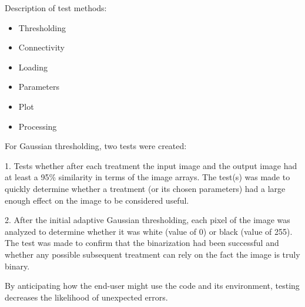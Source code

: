 \begin{enumerate}
Description of test methods:
        \begin{itemize}
            \item Thresholding
            \item Connectivity
            \item Loading
            \item Parameters
            \item Plot
            \item Processing
        \end{itemize}



For Gaussian thresholding, two tests were created:

1. Tests whether after each treatment the input image and the output image had at least a 95\% similarity in terms of the image arrays. The test(s) was made to quickly determine whether a treatment (or its chosen parameters) had a large enough effect on the image to be considered useful.

2. After the initial adaptive Gaussian thresholding, each pixel of the image was analyzed to determine whether it was white (value of 0) or black (value of 255). The test was made to confirm that the binarization had been successful and whether any possible subsequent treatment can rely on the fact the image is truly binary.



By anticipating how the end-user might use the code and its environment, testing decreases the likelihood of unexpected errors. 



\end{enumerate}


